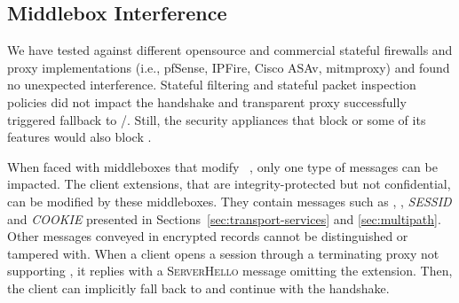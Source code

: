 

\subsection{Middlebox Interference}
\label{sec:middlebox}

We have tested \tcpls against different opensource and commercial 
stateful
firewalls and proxy implementations (i.e., pfSense, IPFire, Cisco ASAv,
mitmproxy) and found no unexpected interference. Stateful filtering and stateful
packet inspection policies did not impact the \tcpls handshake and transparent 
\tls
proxy successfully triggered \tcpls fallback to \tls/\tcp. Still, the security
appliances that block  or some of its features
\cite{lee2019matls,Bock_China,raman2020measuring} would also block \tcpls.

When faced with middleboxes that modify ~\cite{Bock_China,raman2020measuring}, only one type of \tcpls 
messages can be impacted. The client \tls extensions, that are 
integrity-protected but not confidential, can be modified by these middleboxes. 
They contain messages such as \hello, \join, \textit{SESSID} and 
\textit{COOKIE} presented 
in Sections~\ref{sec:transport-services} and \ref{sec:multipath}. Other messages 
conveyed in encrypted \tls records cannot be distinguished or tampered with.
When a client opens a \tcpls session
through a \tls terminating proxy not supporting \tcpls, it replies 
with 
a \textsc{ServerHello} message omitting the \hello extension. Then, the client 
can implicitly fall back to \tls and continue with the handshake.

